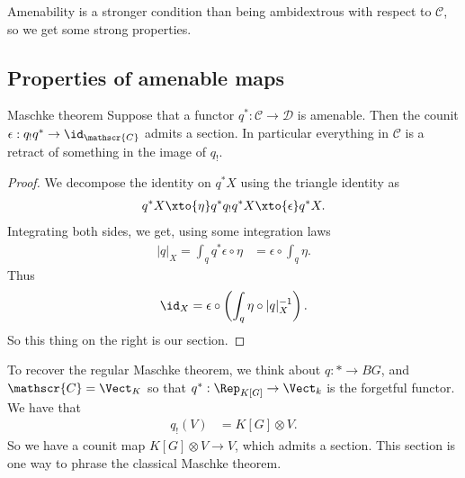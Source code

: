 Amenability is a stronger condition than being ambidextrous with respect to $\mathscr{C}$, so we get some strong properties.

\subsection{Properties of amenable maps}

\begin{customenvironment}{Maschke theorem} Suppose that a functor $q^\ast : \mathscr{C} \to \mathscr{D}$ is amenable. Then the counit $\epsilon: q_! q^\ast \to \id_\mathscr{C}$ admits a section. In particular everything in $\mathscr{C}$ is a retract of something in the image of $q_!$.
\end{customenvironment}
\begin{proof} We decompose the identity on $q^\ast X$ using the triangle identity as
\begin{align*}
    q^\ast X \xto{\eta} q^\ast q_! q^\ast X \xto{\epsilon} q^\ast X.
\end{align*}
Integrating both sides, we get, using some integration laws
\begin{align*}
    |q|_X = \int_q q^\ast \epsilon \circ \eta &= \epsilon \circ \int_q \eta.
\end{align*}
Thus
\begin{align*}
    \id_X = \epsilon \circ \left( \int_q \eta \circ |q|_X^{-1} \right).
\end{align*}
So this thing on the right is our section.
\end{proof}
To recover the regular Maschke theorem, we think about $q: \ast \to BG$, and $\mathscr{C} = \Vect_K$ so that $q^\ast: \Rep_{K[G]} \to \Vect_k$ is the forgetful functor. We have that
\begin{align*}
    q_!(V) &= K[G] \otimes V.
\end{align*}
So we have a counit map $K[G] \otimes V \to V$, which admits a section. This section is one way to phrase the classical Maschke theorem.


